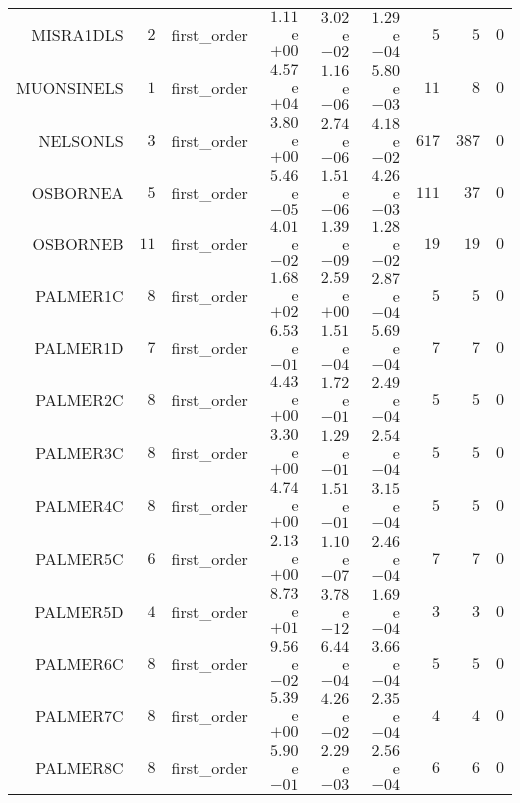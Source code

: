 \begin{longtable}{rrrrrrrrr}
MISRA1DLS & \(     2\) & first\_order & \( 1.11\)e\(+00\) & \( 3.02\)e\(-02\) & \( 1.29\)e\(-04\) & \(     5\) & \(     5\) & \(     0\) \\
MUONSINELS & \(     1\) & first\_order & \( 4.57\)e\(+04\) & \( 1.16\)e\(-06\) & \( 5.80\)e\(-03\) & \(    11\) & \(     8\) & \(     0\) \\
NELSONLS & \(     3\) & first\_order & \( 3.80\)e\(+00\) & \( 2.74\)e\(-06\) & \( 4.18\)e\(-02\) & \(   617\) & \(   387\) & \(     0\) \\
OSBORNEA & \(     5\) & first\_order & \( 5.46\)e\(-05\) & \( 1.51\)e\(-06\) & \( 4.26\)e\(-03\) & \(   111\) & \(    37\) & \(     0\) \\
OSBORNEB & \(    11\) & first\_order & \( 4.01\)e\(-02\) & \( 1.39\)e\(-09\) & \( 1.28\)e\(-02\) & \(    19\) & \(    19\) & \(     0\) \\
PALMER1C & \(     8\) & first\_order & \( 1.68\)e\(+02\) & \( 2.59\)e\(+00\) & \( 2.87\)e\(-04\) & \(     5\) & \(     5\) & \(     0\) \\
PALMER1D & \(     7\) & first\_order & \( 6.53\)e\(-01\) & \( 1.51\)e\(-04\) & \( 5.69\)e\(-04\) & \(     7\) & \(     7\) & \(     0\) \\
PALMER2C & \(     8\) & first\_order & \( 4.43\)e\(+00\) & \( 1.72\)e\(-01\) & \( 2.49\)e\(-04\) & \(     5\) & \(     5\) & \(     0\) \\
PALMER3C & \(     8\) & first\_order & \( 3.30\)e\(+00\) & \( 1.29\)e\(-01\) & \( 2.54\)e\(-04\) & \(     5\) & \(     5\) & \(     0\) \\
PALMER4C & \(     8\) & first\_order & \( 4.74\)e\(+00\) & \( 1.51\)e\(-01\) & \( 3.15\)e\(-04\) & \(     5\) & \(     5\) & \(     0\) \\
PALMER5C & \(     6\) & first\_order & \( 2.13\)e\(+00\) & \( 1.10\)e\(-07\) & \( 2.46\)e\(-04\) & \(     7\) & \(     7\) & \(     0\) \\
PALMER5D & \(     4\) & first\_order & \( 8.73\)e\(+01\) & \( 3.78\)e\(-12\) & \( 1.69\)e\(-04\) & \(     3\) & \(     3\) & \(     0\) \\
PALMER6C & \(     8\) & first\_order & \( 9.56\)e\(-02\) & \( 6.44\)e\(-04\) & \( 3.66\)e\(-04\) & \(     5\) & \(     5\) & \(     0\) \\
PALMER7C & \(     8\) & first\_order & \( 5.39\)e\(+00\) & \( 4.26\)e\(-02\) & \( 2.35\)e\(-04\) & \(     4\) & \(     4\) & \(     0\) \\
PALMER8C & \(     8\) & first\_order & \( 5.90\)e\(-01\) & \( 2.29\)e\(-03\) & \( 2.56\)e\(-04\) & \(     6\) & \(     6\) & \(     0\) \\

\end{longtable}
